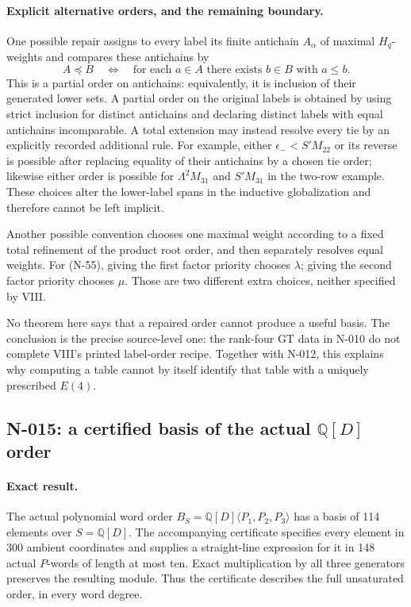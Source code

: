\paragraph{Explicit alternative orders, and the remaining boundary.}
One possible repair assigns to every label its finite
antichain $A_\alpha$ of maximal $H_q$-weights and compares
these antichains by
\[
 A\preceq B\quad\Longleftrightarrow\quad
 \text{for each }a\in A\text{ there exists }b\in B
                       \text{ with }a\le b.
 \tag{N-59}
\]
This is a partial order on antichains: equivalently, it is
inclusion of their generated lower sets.  A partial order on
the original labels is obtained by using strict inclusion
for distinct antichains and declaring distinct labels with
equal antichains incomparable.  A total extension may instead
resolve every tie by an explicitly recorded additional rule.
For example, either $\epsilon_-<S'M_{22}$ or its reverse
is possible after replacing equality of their antichains
by a chosen tie order; likewise either order is possible
for $\Lambda^2M_{31}$ and $S'M_{31}$ in the two-row example.
These choices alter the lower-label spans in the inductive
globalization and therefore cannot be left implicit.

Another possible convention chooses one maximal weight
according to a fixed total refinement of the product root
order, and then separately resolves equal weights.  For
(N-55), giving the first factor priority chooses $\lambda$;
giving the second factor priority chooses $\mu$.  Those are
two different extra choices, neither specified by VIII.

No theorem here says that a repaired order cannot produce a
useful basis.  The conclusion is the precise source-level
one: the rank-four GT data in N-010 do not complete VIII's
printed label-order recipe.  Together with N-012, this
explains why computing a table cannot by itself identify
that table with a uniquely prescribed $E(4)$.


\subsection{N-015: a certified basis of the actual $\mathbb Q[D]$ order}
\label{sec:nonstandard-polynomial-order}

\paragraph{Exact result.}
The actual polynomial word order
$B_S=\mathbb Q[D]\langle P_1,P_2,P_3\rangle$ has a basis of
114 elements over $S=\mathbb Q[D]$.  The accompanying certificate
specifies every element in 300 ambient coordinates and supplies
a straight-line expression for it in 148 actual $P$-words of
length at most ten.  Exact multiplication by all three
generators preserves the resulting module.  Thus the certificate
describes the full unsaturated order, in every word degree.

